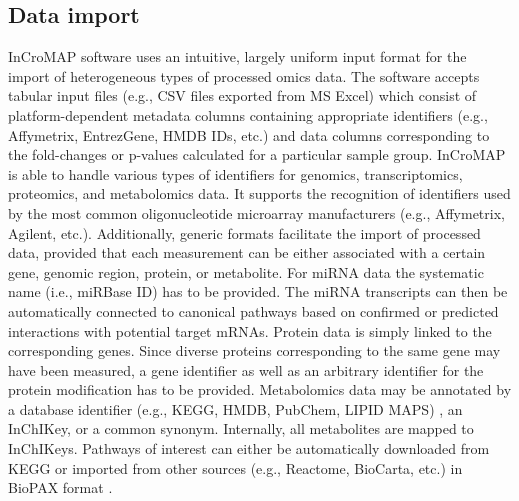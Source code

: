 \documentclass[final,5p,times,twocolumn]{elsarticle}
\newcommand\red[1]{{\color{red}#1}}
\begin{document}
\subsection{Data import}
\red{InCroMAP software uses an intuitive, largely uniform input format for the import of heterogeneous types of processed omics data. The software accepts tabular input files (e.g., CSV files exported from MS Excel) which consist of platform-dependent metadata columns containing appropriate identifiers (e.g., Affymetrix, EntrezGene, HMDB IDs, etc.) and data columns corresponding to the fold-changes or p-values calculated for a particular sample group.}
InCroMAP is able to handle various types of identifiers for genomics, transcriptomics, proteomics, and metabolomics data. It supports the recognition of identifiers used by the most common oligonucleotide microarray manufacturers (e.g., Affymetrix, Agilent, etc.). Additionally, generic formats facilitate the import of processed data, provided that each measurement can be either associated with a certain gene, genomic region, protein, or metabolite. \red{For miRNA data the systematic name (i.e., miRBase ID) has to be provided. The miRNA transcripts can then be automatically connected to canonical pathways based on confirmed or predicted interactions with potential target mRNAs. Protein data is simply linked to the corresponding genes. Since diverse proteins corresponding to the same gene may have been measured, a gene identifier as well as an arbitrary identifier for the protein modification has to be provided.} Metabolomics data may be annotated by a database identifier (e.g., KEGG, HMDB, PubChem, LIPID MAPS)
, an InChIKey, or a common synonym. Internally, all metabolites are mapped to InChIKeys. Pathways of interest can either be automatically downloaded from KEGG or imported from other sources (e.g., Reactome, BioCarta, etc.) in BioPAX format \cite{Eustachio2011}.
\end{document}
